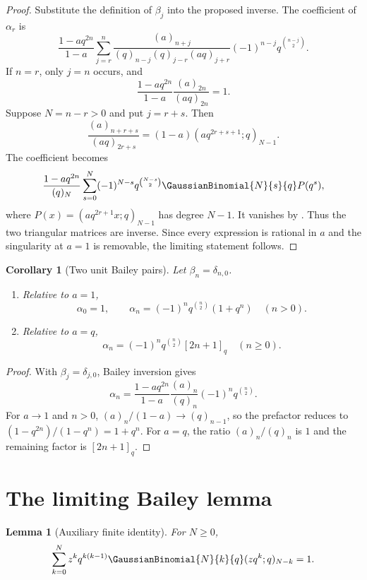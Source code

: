 \documentclass[11pt,a4paper,oneside,openany]{book}
\newtheorem{lemma}[lemma]{Lemma}
\newtheorem{corollary}[corollary]{Corollary}
\theoremstyle{definition}
\theoremstyle{remark}
\begin{document}
\begin{proof}
Substitute the definition of $\beta_j$ into the proposed inverse.  The coefficient of $\alpha_r$ is
\[
 \frac{1-aq^{2n}}{1-a}
 \sum_{j=r}^{n}
 \frac{(a)_{n+j}}{(q)_{n-j}(q)_{j-r}(aq)_{j+r}}
 (-1)^{n-j}q^{\binom{n-j}{2}}.
\]
If $n=r$, only $j=n$ occurs, and
\[
 \frac{1-aq^{2n}}{1-a}\frac{(a)_{2n}}{(aq)_{2n}}=1.
\]
Suppose $N=n-r>0$ and put $j=r+s$.  Then
\[
 \frac{(a)_{n+r+s}}{(aq)_{2r+s}}
 =(1-a)(aq^{2r+s+1};q)_{N-1}.
\]
The coefficient becomes
\[
 \frac{1-aq^{2n}}{(q)_N}
 \sum_{s=0}^{N}(-1)^{N-s}q^{\binom{N-s}{2}}
 \GaussianBinomial{N}{s}{q} P(q^s),
\]
where
\(
 P(x)=(aq^{2r+1}x;q)_{N-1}
\)
has degree $N-1$.  It vanishes by .  Thus the two triangular matrices are inverse.  Since every expression is rational in $a$ and the singularity at $a=1$ is removable, the limiting statement follows.
\end{proof}

\begin{corollary}[Two unit Bailey pairs]\label{cor:unit-bailey-pairs}
Let $\beta_n=\delta_{n,0}$.
\begin{enumerate}[label=\textup{(\roman*)}]
\item Relative to $a=1$,
\[
 \alpha_0=1,
 \qquad
 \alpha_n=(-1)^nq^{\binom n2}(1+q^n)\quad(n>0).
\]
\item Relative to $a=q$,
\[
 \alpha_n=(-1)^nq^{\binom n2}[2n+1]_q\quad(n\ge0).
\]
\end{enumerate}
\end{corollary}

\begin{proof}
With $\beta_j=\delta_{j,0}$, Bailey inversion gives
\[
 \alpha_n=\frac{1-aq^{2n}}{1-a}
 \frac{(a)_n}{(q)_n}(-1)^nq^{\binom n2}.
\]
For $a\to1$ and $n>0$, $(a)_n/(1-a)\to(q)_{n-1}$, so the prefactor reduces to
\(
 (1-q^{2n})/(1-q^n)=1+q^n.
\)
For $a=q$, the ratio $(a)_n/(q)_n$ is $1$ and the remaining factor is $[2n+1]_q$.
\end{proof}

\section{The limiting Bailey lemma}

\begin{lemma}[Auxiliary finite identity]\label{lem:bailey-aux}
For $N\ge0$,
\[
 \sum_{k=0}^{N}z^kq^{k(k-1)}\GaussianBinomial{N}{k}{q}
 (zq^k;q)_{N-k}=1.
\]
\end{lemma}
\end{document}
